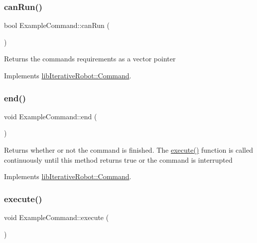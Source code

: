 \subsubsection{\texorpdfstring{canRun()}{canRun()}}
{\footnotesize\ttfamily bool Example\+Command\+::can\+Run (\begin{DoxyParamCaption}{ }\end{DoxyParamCaption})\hspace{0.3cm}{\ttfamily [virtual]}}

Returns the command\textquotesingle{}s requirements as a vector pointer 

Implements \mbox{\hyperlink{classlib_iterative_robot_1_1_command_aebef0fdf029a15ee48fbb778c4265609}{lib\+Iterative\+Robot\+::\+Command}}.

\mbox{\label{class_example_command_ac3da078fdf1e7a7f94488db815bb0457}} 
\subsubsection{\texorpdfstring{end()}{end()}}
{\footnotesize\ttfamily void Example\+Command\+::end (\begin{DoxyParamCaption}{ }\end{DoxyParamCaption})\hspace{0.3cm}{\ttfamily [virtual]}}

Returns whether or not the command is finished. The \mbox{\hyperlink{class_example_command_af6fead537dd568d80aa3097ca207eda5}{execute()}} function is called continuously until this method returns true or the command is interrupted 

Implements \mbox{\hyperlink{classlib_iterative_robot_1_1_command_ab30847f09859387b70bb7846f7ce7ca4}{lib\+Iterative\+Robot\+::\+Command}}.

\mbox{\label{class_example_command_af6fead537dd568d80aa3097ca207eda5}} 
\subsubsection{\texorpdfstring{execute()}{execute()}}
{\footnotesize\ttfamily void Example\+Command\+::execute (\begin{DoxyParamCaption}{ }\end{DoxyParamCaption})\hspace{0.3cm}{\ttfamily [virtual]}}

